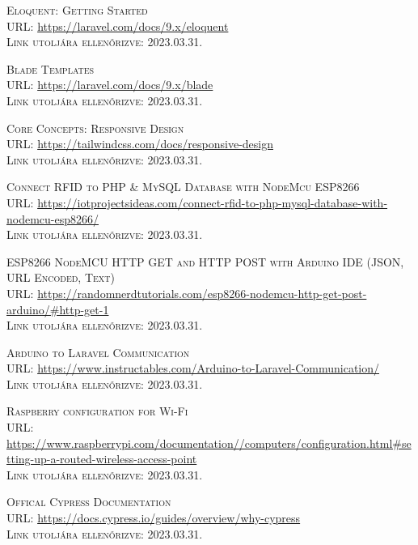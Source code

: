 \documentclass[
]{thesis-ekf}
\theoremstyle{definition}
\theoremstyle{remark}
\begin{document}
\begin{thebibliography}{20}
		\textsc{Eloquent: Getting Started}\\
		\textsc{URL:} \url{https://laravel.com/docs/9.x/eloquent}\\
		\textsc{Link utoljára ellenőrizve:} 2023.03.31.
		
		\textsc{Blade Templates}\\
		\textsc{URL:} \url{https://laravel.com/docs/9.x/blade}\\
		\textsc{Link utoljára ellenőrizve:} 2023.03.31.
		
		\textsc{Core Concepts: Responsive Design}\\
		\textsc{URL:} \url{https://tailwindcss.com/docs/responsive-design}\\
		\textsc{Link utoljára ellenőrizve:} 2023.03.31.
		
		\textsc{Connect RFID to PHP \& MySQL Database with NodeMcu ESP8266}\\
		\textsc{URL:} \url{https://iotprojectsideas.com/connect-rfid-to-php-mysql-database-with-nodemcu-esp8266/}\\
		\textsc{Link utoljára ellenőrizve:} 2023.03.31.
		
		\textsc{ESP8266 NodeMCU HTTP GET and HTTP POST with Arduino IDE (JSON, URL Encoded, Text)}\\
		\textsc{URL:} \url{https://randomnerdtutorials.com/esp8266-nodemcu-http-get-post-arduino/#http-get-1}\\
		\textsc{Link utoljára ellenőrizve:} 2023.03.31.
		
		\textsc{Arduino to Laravel Communication}\\
		\textsc{URL:} \url{https://www.instructables.com/Arduino-to-Laravel-Communication/}\\
		\textsc{Link utoljára ellenőrizve:} 2023.03.31.
		
		\textsc{Raspberry configuration for Wi-Fi}\\
		\textsc{URL:} \url{https://www.raspberrypi.com/documentation//computers/configuration.html#setting-up-a-routed-wireless-access-point}\\
		\textsc{Link utoljára ellenőrizve:} 2023.03.31.
	
		\textsc{Offical Cypress Documentation}\\
		\textsc{URL:} \url{https://docs.cypress.io/guides/overview/why-cypress}\\
		\textsc{Link utoljára ellenőrizve:} 2023.03.31.
				
	\end{thebibliography}
	
	
\end{document}
